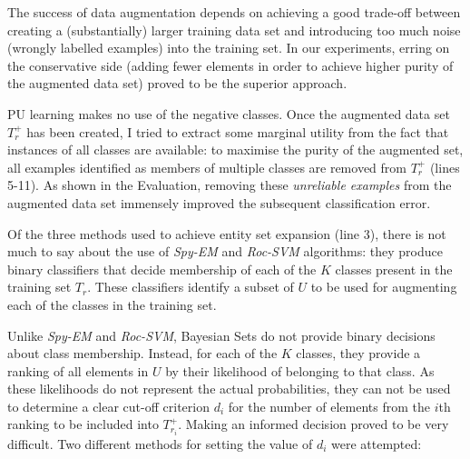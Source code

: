 \documentclass[12pt,twoside,notitlepage,amsart]{report} %
\begin{document}
		
	
	The success of data augmentation depends on achieving a good trade-off between {creating a (substantially) larger training data set} and {introducing too much noise} (wrongly labelled examples) into the training set. In our experiments, erring on the conservative side (adding {fewer elements} in order to achieve {higher purity} of the augmented data set) proved to be the superior approach. 
	
	PU learning makes no use of the negative classes. Once the augmented data set $T_{r}^{+}$ has been created, I tried to extract some marginal utility from the fact that instances of all classes are available: to maximise the purity of the augmented set, all examples identified as members of multiple classes are removed from $T_r^{+}$ (lines 5-11). As shown in the Evaluation, removing these \emph{unreliable examples} from the augmented data set immensely improved the subsequent classification error.  
	
	
	Of the three methods used to achieve entity set expansion (line 3), there is not much to say about the use of \emph{Spy-EM} and \emph{Roc-SVM} algorithms: they produce binary classifiers that decide membership of each of the $K$ classes present in the training set $T_r$. These classifiers identify a subset of $U$ to be used for augmenting each of the classes in the training set.
	
	
	Unlike \emph{Spy-EM} and \emph{Roc-SVM}, Bayesian Sets do not provide binary decisions about class membership. Instead, for each of the $K$ classes, they provide a ranking of all elements in $U$ by their likelihood of belonging to that class. As these likelihoods do not represent the actual probabilities, they can not be used to determine a clear cut-off criterion $d_i$ for the number of elements from the $i$th ranking to be included into $T_{r_i}^{+}$. Making an informed decision proved to be very difficult. Two different methods for setting the value of $d_i$ were attempted: 
	
	
\end{document}
